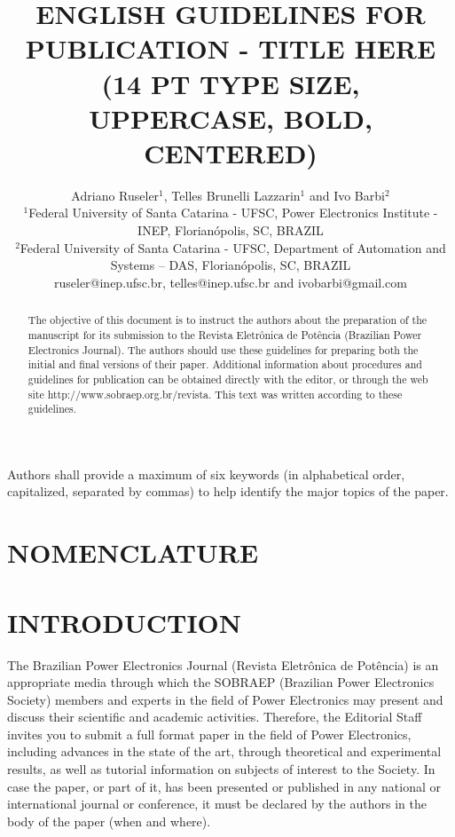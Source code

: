 \documentclass[english]{cobep-spec}
\title{ENGLISH GUIDELINES FOR PUBLICATION - TITLE HERE \\(14 PT TYPE SIZE, UPPERCASE, BOLD, CENTERED)}
\author{Adriano Ruseler$^{1}$, Telles Brunelli Lazzarin$^{1}$ and Ivo Barbi$^{2}$\\
	\normalsize $^{1}$Federal University of Santa Catarina - UFSC, Power Electronics Institute - INEP, Florian\'opolis, SC, BRAZIL\\
	\normalsize $^{2}$Federal University of Santa Catarina - UFSC, Department of Automation and Systems -- DAS, Florian\'opolis, SC, BRAZIL\\
	\normalsize ruseler@inep.ufsc.br, telles@inep.ufsc.br and ivobarbi@gmail.com
}
\begin{document}
\maketitle

\begin{abstract}
	The objective of this document is to instruct the authors about the preparation of the manuscript for its submission to the Revista Eletrônica de Potência (Brazilian Power Electronics Journal). The authors should use these guidelines for preparing both the initial and final versions of their paper. Additional information about procedures and guidelines for publication can be obtained directly with the editor, or through the web site http://www.sobraep.org.br/revista. This text was written according to these guidelines.
\end{abstract}

\begin{keywords}
	Authors shall provide a maximum of six keywords (in alphabetical order, capitalized, separated by commas) to help identify the major topics of the paper.
\end{keywords}

\let\thefootnote\relax{}

\section*{NOMENCLATURE}




\section{INTRODUCTION}

The Brazilian Power Electronics Journal (Revista Eletrônica de Potência) is an appropriate media through which the SOBRAEP (Brazilian Power Electronics Society) members and experts in the field of Power Electronics may present and discuss their scientific and academic activities. Therefore, the Editorial Staff invites you to submit a full format paper in the field of Power Electronics, including advances in the state of the art, through theoretical and experimental results, as well as tutorial information on subjects of interest to the Society. In case the paper, or part of it, has been presented or published in any national or international journal or conference, it must be declared by the authors in the body of the paper (when and where). 
\end{document}
